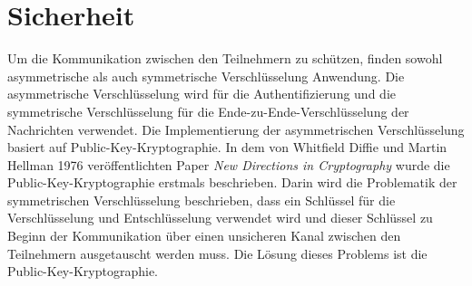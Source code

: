 \section{Sicherheit}
\label{subsec:sicherheit}

Um die Kommunikation zwischen den Teilnehmern zu schützen, finden sowohl asymmetrische als auch symmetrische Verschlüsselung Anwendung. Die asymmetrische Verschlüsselung wird für die Authentifizierung und die symmetrische Verschlüsselung für die Ende-zu-Ende-Verschlüsselung der Nachrichten verwendet. Die Implementierung der asymmetrischen Verschlüsselung basiert auf Public-Key-Kryptographie. In dem von Whitfield Diffie und Martin Hellman 1976 veröffentlichten Paper \textit{New Directions in Cryptography} \parencite{DiffieHellman_NewDirectionsInCryptography} wurde die Public-Key-Kryptographie erstmals beschrieben. Darin wird die Problematik der symmetrischen Verschlüsselung beschrieben, dass ein Schlüssel für die Verschlüsselung und Entschlüsselung verwendet wird und dieser Schlüssel zu Beginn der Kommunikation über einen unsicheren Kanal zwischen den Teilnehmern ausgetauscht werden muss. Die Lösung dieses Problems ist die Public-Key-Kryptographie.